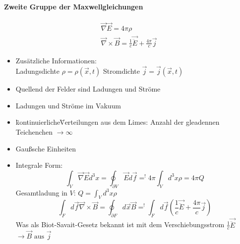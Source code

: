 \documentclass[a4paper]{article}
\begin{document}
\paragraph{Zweite Gruppe der Maxwellgleichungen}
\begin{align}
\vec{\nabla}\vec{E}=4\pi\rho\\
\vec{\nabla}\times\vec{B}=\frac{1}{c}\vec{\ddot{E}}+\frac{4\pi}{c}\vec{j}
\end{align}
\begin{itemize}
  \item Zusätzliche Informationen: \\
   Ladungsdichte $\rho=\rho(\vec{x},t)$
   Stromdichte $\vec{j}=\vec{j}(\vec{x},t)$
  \item Quellend der Felder sind Ladungen und Ströme
  \item Ladungen und Ströme im Vakuum
  \item \"kontinuierliche\" Verteilungen aus dem Limes: Anzahl der gleadennen
  Teichenchen $\rightarrow \infty$
  \item Gaußsche Einheiten
  \item Integrale Form: \begin{equation}
  \int_V\vec{\nabla}\vec{E}d^3x=\oint_{\partial V}\vec{E}d\vec{f}=^!
  4\pi\int_Vd^3x\rho =4\pi Q
  \end{equation} 
  Gesamtladung in $V$: $Q=\int_V d^3x \rho$
  \begin{equation}
  \int_F d\vec{f}\vec{\nabla}\times\vec{B}=\oint_{\partial F}d\vec{x}\vec{B}=^!
  \int_Fd\vec{f}(\frac{1}{c}\vec{\ddot{E}}+\frac{4\pi}{c}\vec{j})
  \end{equation}
  Was als Biot-Savait-Gesetz bekannt ist mit dem Verschiebungsstrom
  $\frac{1}{c}\vec{\ddot{E}}$ \\
  $\rightarrow \vec{B} \text{ aus } \vec{j}$
\end{itemize}
\end{document}
